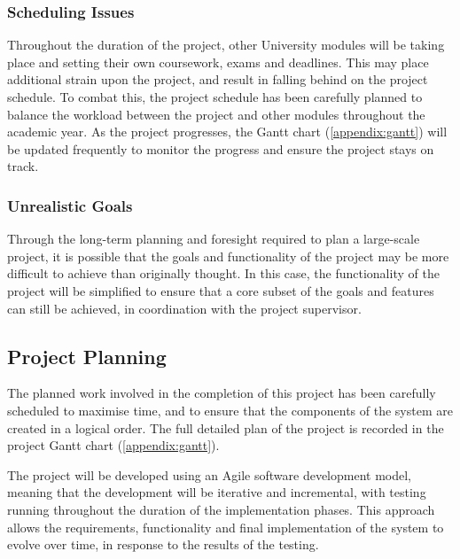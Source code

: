 \documentclass[12pt,a4paper]{article}
\begin{document}
\subsubsection{Scheduling Issues}
Throughout the duration of the project, other University modules will be taking place and setting their own coursework, exams and deadlines. This may place additional strain upon the project, and result in falling behind on the project schedule. To combat this, the project schedule has been carefully planned to balance the workload between the project and other modules throughout the academic year. As the project progresses, the Gantt chart (\autoref{appendix:gantt}) will be updated frequently to monitor the progress and ensure the project stays on track.

\subsubsection{Unrealistic Goals}
Through the long-term planning and foresight required to plan a large-scale project, it is possible that the goals and functionality of the project may be more difficult to achieve than originally thought. In this case, the functionality of the project will be simplified to ensure that a core subset of the goals and features can still be achieved, in coordination with the project supervisor.

\subsection{Project Planning}

The planned work involved in the completion of this project has been carefully scheduled to maximise time, and to ensure that the components of the system are created in a logical order. The full detailed plan of the project is recorded in the project Gantt chart (\autoref{appendix:gantt}).

The project will be developed using an Agile software development model, meaning that the development will be iterative and incremental, with testing running throughout the duration of the implementation phases. This approach allows the requirements, functionality and final implementation of the system to evolve over time, in response to the results of the testing.
\end{document}

